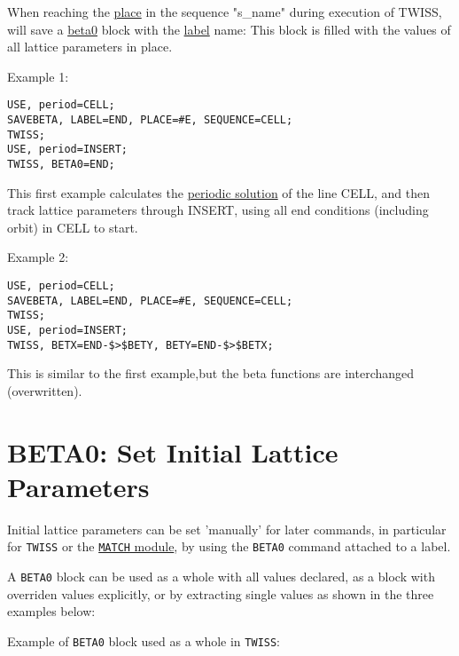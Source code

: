 When reaching the \href{../control/general.html#place}{place} in the
sequence "s\_name" during execution of TWISS, \madx will save a
\hyperlink{beta0}{beta0} block with the
\href{../Introduction/label.html}{label} name: This block is filled with
the values of all lattice parameters in place.  

Example 1: 
\begin{verbatim}
USE, period=CELL;
SAVEBETA, LABEL=END, PLACE=#E, SEQUENCE=CELL;
TWISS;
USE, period=INSERT;
TWISS, BETA0=END;
\end{verbatim}
This first example calculates the \hyperlink{periodic}{periodic
  solution} of the line CELL, and then track lattice parameters through
INSERT, using all end conditions (including orbit) in CELL to start.  

Example 2: 
\begin{verbatim}
USE, period=CELL;
SAVEBETA, LABEL=END, PLACE=#E, SEQUENCE=CELL;
TWISS;
USE, period=INSERT;
TWISS, BETX=END-$>$BETY, BETY=END-$>$BETX;
\end{verbatim}
This is similar to the first example,but the beta functions are interchanged (overwritten).  

\section{BETA0: Set Initial Lattice Parameters}
\label{sec:beta0}
Initial lattice parameters can be set 'manually' for later commands, in
particular for \texttt{TWISS} or the \href{../match/match.html}{\texttt{MATCH} module}, by
using the \texttt{BETA0} command attached to a label.  


A \texttt{BETA0} block can be used as a whole with all values declared,
as a block with overriden values explicitly, or by extracting single
values as shown in the three examples below:

Example of \texttt{BETA0} block used as a whole in \texttt{TWISS}: 

